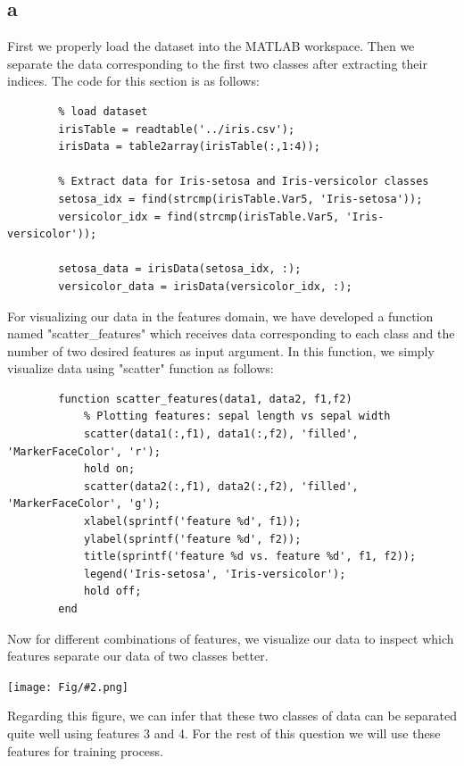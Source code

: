 \documentclass[]{article}
\newcommand{\pict}[2]{\begin{center}
		\texttt{[image: Fig/\#2.png]}
\end{center}}
\begin{document}
	\subsection*{a}
	First we properly load the dataset into the MATLAB workspace. Then we separate the data corresponding to the first two classes after extracting their indices. The code for this section is as follows:
	\begin{lstlisting}
		% load dataset
		irisTable = readtable('../iris.csv');
		irisData = table2array(irisTable(:,1:4));
		
		% Extract data for Iris-setosa and Iris-versicolor classes
		setosa_idx = find(strcmp(irisTable.Var5, 'Iris-setosa'));
		versicolor_idx = find(strcmp(irisTable.Var5, 'Iris-versicolor'));
		
		setosa_data = irisData(setosa_idx, :);
		versicolor_data = irisData(versicolor_idx, :);
	\end{lstlisting}
	For visualizing our data in the features domain, we have developed a function named "scatter\_features" which receives data corresponding to each class and the number of two desired features as input argument. In this function, we simply visualize data using "scatter" function as follows:
	\begin{lstlisting}
		function scatter_features(data1, data2, f1,f2)
			% Plotting features: sepal length vs sepal width
			scatter(data1(:,f1), data1(:,f2), 'filled', 'MarkerFaceColor', 'r');
			hold on;
			scatter(data2(:,f1), data2(:,f2), 'filled', 'MarkerFaceColor', 'g');
			xlabel(sprintf('feature %d', f1));
			ylabel(sprintf('feature %d', f2));
			title(sprintf('feature %d vs. feature %d', f1, f2));
			legend('Iris-setosa', 'Iris-versicolor');
			hold off;
		end
	\end{lstlisting}
	Now for different combinations of features, we visualize our data to inspect which features separate our data of two classes better.
	\pict{0.9}{Q2_F1}
	Regarding this figure, we can infer that these two classes of data can be separated quite well using features 3 and 4. For the rest of this question we will use these features for training process.
	
\end{document}
